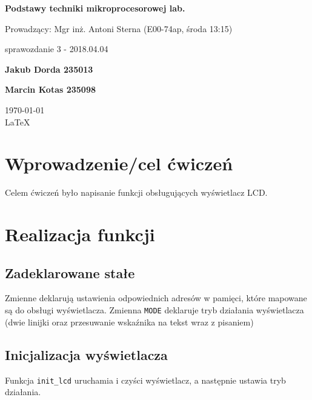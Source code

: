 \documentclass[12pt,a4paper]{article}
\begin{document}
	
	\begin{titlepage}
		
		\centering
		{\huge\bfseries Podstawy techniki mikroprocesorowej lab.\par}
		
		\vspace{0.5cm}
		Prowadzący: Mgr inż. Antoni Sterna (E00-74ap, środa 13:15) \\
	
		\vspace{1.1cm}
		{\Large sprawozdanie 3 - 2018.04.04\par}
		\vfill
		
		{\large\bfseries Jakub Dorda 235013\par}
		{\large\bfseries Marcin Kotas 235098\par}
		
		\vspace{1cm}
		\today \\ \LaTeX
		
		\restoregeometry
	\end{titlepage}


	\section{Wprowadzenie/cel ćwiczeń}
		Celem ćwiczeń było napisanie funkcji obsługujących wyświetlacz LCD\@.
		
	\section{Realizacja funkcji}
		\subsection{Zadeklarowane stałe}
			\begin{minipage}{.5\textwidth}
				
			\end{minipage}%
			\begin{minipage}{.5\textwidth}
				Zmienne deklarują ustawienia odpowiednich adresów w pamięci, które mapowane są do obsługi wyświetlacza.
				Zmienna \texttt{MODE} deklaruje tryb działania wyświetlacza (dwie linijki oraz przesuwanie wskaźnika na tekst wraz z pisaniem)
			\end{minipage}
		
		\subsection{Inicjalizacja wyświetlacza}
			\begin{minipage}{.5\textwidth}
				
			\end{minipage}%
			\begin{minipage}{.5\textwidth}
				Funkcja \texttt{init\_lcd} uruchamia i czyści wyświetlacz, a następnie ustawia tryb działania.
			\end{minipage}
\end{document}
